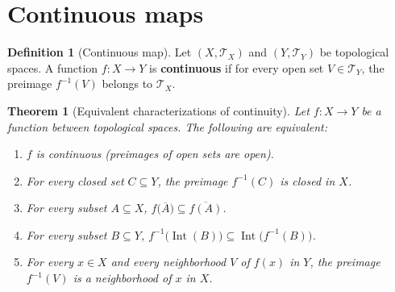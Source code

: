 \documentclass[11pt,a4paper,twoside]{book}
\newtheorem{theorem}{Theorem}[section]
\theoremstyle{remark}
\theoremstyle{definition}
\theoremstyle{definition}
\newtheorem{definition}{Definition}[section]
\begin{document}
\section{Continuous maps}
\label{sec:continuous-maps}

\begin{definition}[Continuous map]
\label{def:continuous}
Let $(X,\mathscr{T}_X)$ and $(Y,\mathscr{T}_Y)$ be topological spaces.  A
function $f\colon X\to Y$ is \textbf{continuous} if for every open set
$V\in\mathscr{T}_Y$, the preimage $f^{-1}(V)$ belongs to $\mathscr{T}_X$.
\end{definition}

\begin{theorem}[Equivalent characterizations of continuity]
\label{thm:continuity-equiv}
Let $f\colon X\to Y$ be a function between topological spaces.  The following
are equivalent:
\begin{enumerate}
    \item \label{item:cont-open}
        $f$ is continuous (preimages of open sets are open).
    \item \label{item:cont-closed}
        For every closed set $C\subseteq Y$, the preimage $f^{-1}(C)$ is
        closed in $X$.
    \item \label{item:cont-closure}
        For every subset $A\subseteq X$,\;
        $f\bigl(\overline{A}\bigr)\subseteq\overline{f(A)}$.
    \item \label{item:cont-interior}
        For every subset $B\subseteq Y$,\;
        $f^{-1}\bigl(\operatorname{Int}(B)\bigr)\subseteq
        \operatorname{Int}\bigl(f^{-1}(B)\bigr)$.
    \item \label{item:cont-nbhd}
        For every $x\in X$ and every neighborhood $V$ of $f(x)$ in $Y$, the
        preimage $f^{-1}(V)$ is a neighborhood of $x$ in $X$.
\end{enumerate}
\end{theorem}
\end{document}
